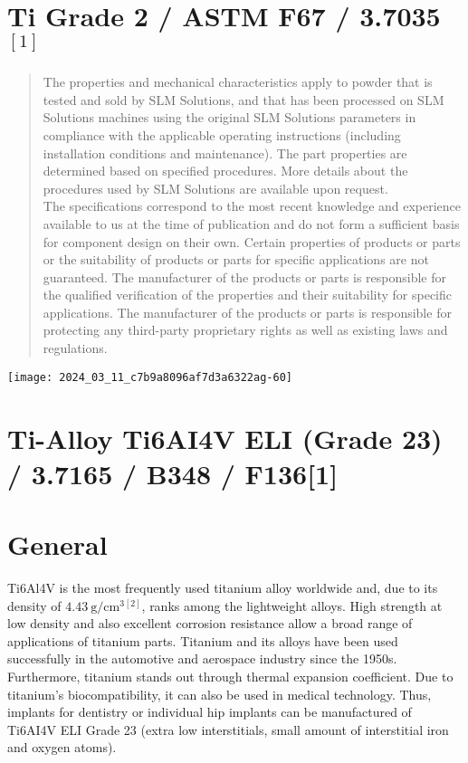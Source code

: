 \documentclass[10pt]{article}
\begin{document}
\section*{Ti Grade 2 / ASTM F67 / 3.7035 ${ }^{[1]}$ }
\begin{abstract}
The properties and mechanical characteristics apply to powder that is tested and sold by SLM Solutions, and that has been processed on SLM Solutions machines using the original SLM Solutions parameters in compliance with the applicable operating instructions (including installation conditions and maintenance). The part properties are determined based on specified procedures. More details about the procedures used by SLM Solutions are available upon request.\\
The specifications correspond to the most recent knowledge and experience available to us at the time of publication and do not form a sufficient basis for component design on their own. Certain properties of products or parts or the suitability of products or parts for specific applications are not guaranteed. The manufacturer of the products or parts is responsible for the qualified verification of the properties and their suitability for specific applications. The manufacturer of the products or parts is responsible for protecting any third-party proprietary rights as well as existing laws and regulations.
\end{abstract}

\begin{center}
\texttt{[image: 2024\_03\_11\_c7b9a8096af7d3a6322ag-60]}
\end{center}

\section*{Ti-Alloy Ti6AI4V ELI (Grade 23) / 3.7165 / B348 / F136[1]}
\section*{General}
Ti6Al4V is the most frequently used titanium alloy worldwide and, due to its density of $4.43 \mathrm{~g} / \mathrm{cm}^{3}{ }^{[2]}$, ranks among the lightweight alloys. High strength at low density and also excellent corrosion resistance allow a broad range of applications of titanium parts. Titanium and its alloys have been used successfully in the automotive and aerospace industry since the 1950s. Furthermore, titanium stands out through thermal expansion coefficient. Due to titanium's biocompatibility, it can also be used in medical technology. Thus, implants for dentistry or individual hip implants can be manufactured of Ti6AI4V ELI Grade 23 (extra low interstitials, small amount of interstitial iron and oxygen atoms).
\end{document}

